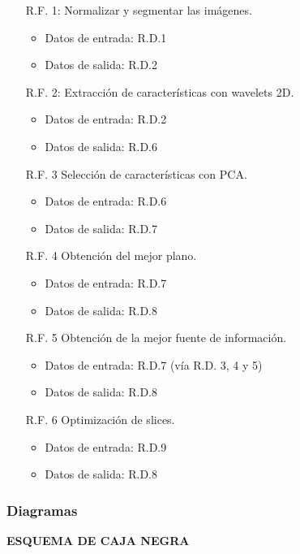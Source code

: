 \begin{itemize}
	\item[R.F. 1:] Normalizar y segmentar las imágenes.
	\begin{itemize}
		\item Datos de entrada: R.D.1
		\item Datos de salida: R.D.2
	\end{itemize}
	\item[R.F. 2:] Extracción de características con wavelets 2D.
	\begin{itemize}
		\item Datos de entrada: R.D.2
		\item Datos de salida: R.D.6
	\end{itemize}
	\item[R.F. 3] Selección de características con PCA.
	\begin{itemize}
		\item Datos de entrada: R.D.6
		\item Datos de salida: R.D.7
	\end{itemize}
	\item[R.F. 4] Obtención del mejor plano.
	\begin{itemize}
		\item Datos de entrada: R.D.7
		\item Datos de salida: R.D.8
	\end{itemize}
	\item[R.F. 5] Obtención de la mejor fuente de información.
	\begin{itemize}
		\item Datos de entrada: R.D.7 (vía R.D. 3, 4 y 5)
		\item Datos de salida: R.D.8
	\end{itemize}
	\item[R.F. 6] Optimización de slices.
	\begin{itemize}
		\item Datos de entrada: R.D.9
		\item Datos de salida: R.D.8
	\end{itemize}
\end{itemize}

\subsubsection{Diagramas}
\vspace{1.5cm}
\textbf{ESQUEMA DE CAJA NEGRA}

